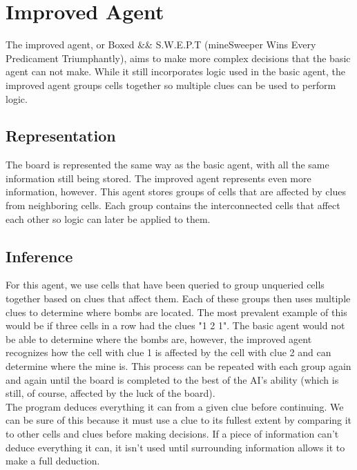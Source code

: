 \documentclass[13pt]{report}
\begin{document}
\break
\section*{Improved Agent}
The improved agent, or Boxed && S.W.E.P.T (mineSweeper Wins Every Predicament Triumphantly), aims to make more complex decisions that the basic agent can not make. While it still incorporates logic used in the basic agent, the improved agent groups cells together so multiple clues can be used to perform logic.

\subsection*{Representation}
The board is represented the same way as the basic agent, with all the same information still being stored. The improved agent represents even more information, however. This agent stores groups of cells that are affected by clues from neighboring cells. Each group contains the interconnected cells that affect each other so logic can later be applied to them.

\subsection*{Inference}
For this agent, we use cells that have been queried to group unqueried cells together based on clues that affect them. Each of these groups then uses multiple clues to determine where bombs are located. The most prevalent example of this would be if three cells in a row had the clues "1 2 1". The basic agent would not be able to determine where the bombs are, however, the improved agent recognizes how the cell with clue 1 is affected by the cell with clue 2 and can determine where the mine is. This process can be repeated with each group again and again until the board is completed to the best of the AI's ability (which is still, of course, affected by the luck of the board).\\
The program deduces everything it can from a given clue before continuing. We can be sure of this because it must use a clue to its fullest extent by comparing it to other cells and clues before making decisions. If a piece of information can't deduce everything it can, it isn't used until surrounding information allows it to make a full deduction.
\end{document}
